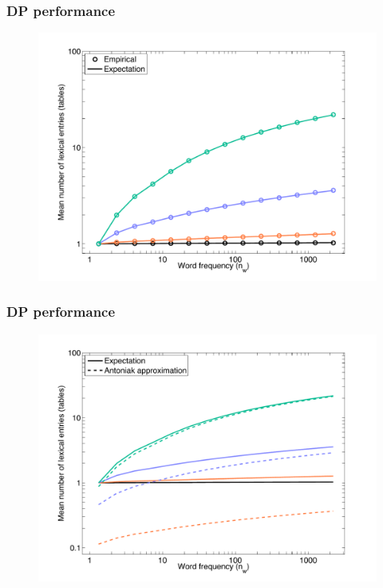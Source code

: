 \documentclass{beamer}
\begin{document}
\begin{frame}
\frametitle{DP performance}
\begin{figure}
{\centering \includegraphics[scale=0.45]{code/plot1.pdf}}
\end{figure}
\end{frame}

\begin{frame}
\frametitle{DP performance}
\begin{figure}
{\centering \includegraphics[scale=0.45]{code/plot2.pdf}}
\end{figure}
\end{frame}
\end{document}
